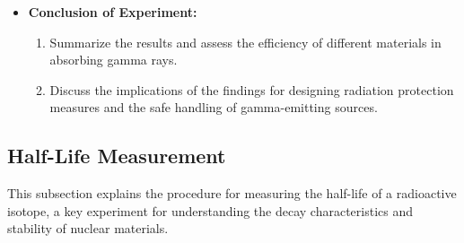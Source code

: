 \documentclass[11pt]{article}
\begin{document}
\begin{itemize}
		\item \textbf{Conclusion of Experiment:}
		\begin{enumerate}
			\item Summarize the results and assess the efficiency of different materials in absorbing gamma rays.
			\item Discuss the implications of the findings for designing radiation protection measures and the safe handling of gamma-emitting sources.
		\end{enumerate}
	\end{itemize}
	
	\subsection{Half-Life Measurement}
	
	This subsection explains the procedure for measuring the half-life of a radioactive isotope, a key experiment for understanding the decay characteristics and stability of nuclear materials.
	
\end{document}
